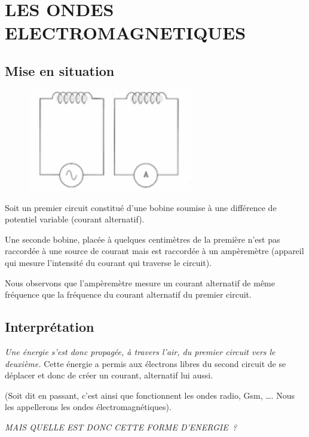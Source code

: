 \section{LES ONDES ELECTROMAGNETIQUES}


\subsection{Mise en situation}

\begin{figure}
\centering
\includegraphics[width=7.297cm,height=4.45cm]{Pictures/10000001000000B7000000703138DA7480AE6A8A.png}
\caption{}
\end{figure}

Soit un premier circuit constitué d'une bobine soumise à une différence
de potentiel variable (courant alternatif).

Une seconde bobine, placée à quelques centimètres de la première n'est
pas raccordée à une source de courant mais est raccordée à un
ampèremètre (appareil qui mesure l'intensité du courant qui traverse le
circuit).

Nous observons que l'ampèremètre mesure un courant alternatif de même
fréquence que la fréquence du courant alternatif du premier circuit.

\subsection{Interprétation}

\emph{Une énergie s'est donc propagée, à travers l'air, du
premier circuit vers le deuxième.} Cette énergie a permis aux électrons
libres du second circuit de se déplacer et donc de créer un courant,
alternatif lui aussi.

(Soit dit en passant, c'est ainsi que fonctionnent les ondes radio, Gsm, \ldots. Nous les appellerons les ondes électromagnétiques).

\emph{MAIS QUELLE EST DONC CETTE FORME D'ENERGIE~? }

